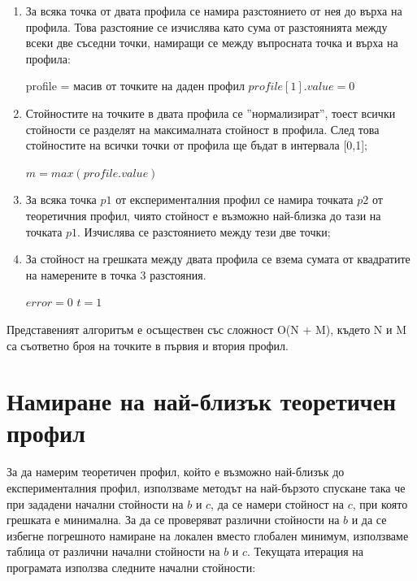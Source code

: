\documentclass{article}
\begin{document}
\begin{enumerate}
    \item За всяка точка от двата профила се намира разстоянието от нея до върха на профила. Това разстояние се изчислява като сума от разстоянията между всеки две съседни точки, намиращи се между въпросната точка и върха на профила:
    \begin{algorithm}[H]
        profile = масив от точките на даден профил\;
        $profile[1].value = 0$\;
    \end{algorithm}
    \newpage
    \item Стойностите на точките в двата профила се ''нормализират'', тоест всички стойности се разделят на максималната стойност в профила. След това стойностите на всички точки от профила ще бъдат в интервала [0,1];
    \begin{algorithm}[H]
        $m = max(profile.value)$\;
    \end{algorithm}
    \item За всяка точка \(p1\) от експерименталния профил се намира точката \(p2\) от теоретичния профил, чиято стойност е възможно най-близка до тази на точката \(p1\). Изчислява се разстоянието между тези две точки;
    \item За стойност на грешката между двата профила се взема сумата от квадратите на намерените в точка 3 разстояния.
    \begin{algorithm}[H]
        $error = 0$\;
        $t = 1$\;
    \end{algorithm}

\end{enumerate}
Представеният алгоритъм е осъществен със сложност O(N + M), където N и M са съответно броя на точките в първия и втория профил.

\section{Намиране на най-близък теоретичен профил}
За да намерим теоретичен профил, който е възможно най-близък до експерименталния профил, използваме методът на най-бързото спускане така че при зададени начални стойности на \(b\) и \(c\), да се намери стойност на \(c\), при която грешката е минимална. За да се проверяват различни стойности на \(b\) и да се избегне погрешното намиране на локален вместо глобален минимум, използваме таблица от различни начални стойности на $b$ и $c$. Текущата итерация на програмата използва следните начални стойности:
\end{document}
